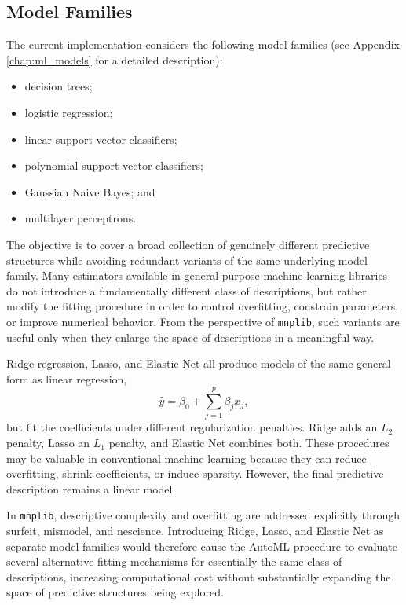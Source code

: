 
\subsection*{Model Families}

The current implementation considers the following model families (see Appendix \ref{chap:ml_models} for a detailed description):

\begin{itemize}
    \item decision trees;
    \item logistic regression;
    \item linear support-vector classifiers;
    \item polynomial support-vector classifiers;
    \item Gaussian Naive Bayes; and
    \item multilayer perceptrons.
\end{itemize}

The objective is to cover a broad collection of genuinely different predictive structures while avoiding redundant variants of the same underlying model family. Many estimators available in general-purpose machine-learning libraries do not introduce a fundamentally different class of descriptions, but rather modify the fitting procedure in order to control overfitting, constrain parameters, or improve numerical behavior. From the perspective of \texttt{mnplib}, such variants are useful only when they enlarge the space of descriptions in a meaningful way.

\begin{example}
Ridge regression, Lasso, and Elastic Net all produce models of the same general form as linear regression,
\[
\widehat y = \beta_0+\sum_{j=1}^{p}\beta_j x_j,
\]
but fit the coefficients under different regularization penalties. Ridge adds an $L_2$ penalty, Lasso an $L_1$ penalty, and Elastic Net combines both. These procedures may be valuable in conventional machine learning because they can reduce overfitting, shrink coefficients, or induce sparsity. However, the final predictive description remains a linear model.

In \texttt{mnplib}, descriptive complexity and overfitting are addressed explicitly through surfeit, mismodel, and nescience. Introducing Ridge, Lasso, and Elastic Net as separate model families would therefore cause the AutoML procedure to evaluate several alternative fitting mechanisms for essentially the same class of descriptions, increasing computational cost without substantially expanding the space of predictive structures being explored.
\end{example}

